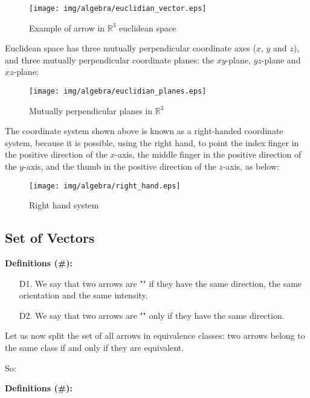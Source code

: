 \begin{figure}[H]
\centering
\texttt{[image: img/algebra/euclidian\_vector.eps]}
\caption{Example of arrow in $\mathbb{R}^3$ euclidean space}
\end{figure}

Euclidean space has three mutually perpendicular coordinate axes ($x$, $y$ and $z$), and three mutually perpendicular coordinate planes: the $xy$-plane, $yz$-plane and $xz$-plane:

\begin{figure}[H]
\centering
\texttt{[image: img/algebra/euclidian\_planes.eps]}
\caption{Mutually perpendicular planes in $\mathbb{R}^3$}
\end{figure}

The coordinate system shown above is known as a right-handed coordinate system, because it is possible, using the right hand, to point the index finger in the positive direction of the $x$-axis, the middle finger in the positive direction of the $y$-axis, and the thumb in the positive direction of the $z$-axis, as below:

\begin{figure}[H]
\centering
\texttt{[image: img/algebra/right\_hand.eps]}
\caption{Right hand system}
\end{figure}


	\subsection{Set of Vectors}	

\textbf{Definitions (\#\mydef):}

	\begin{enumerate}
		\item[D1.] We say that two arrows are ""   if they have the same direction, the same orientation and the same intensity.
		\item[D2.] We say that two arrows are "" only if they have the same direction.
	\end{enumerate}
Let us now split the set of all arrows in equivalence classes: two arrows belong to the same class if and only if they are equivalent.

So:

\textbf{Definitions (\#\mydef):} 

